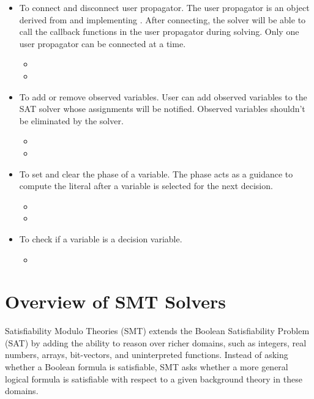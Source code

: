 \begin{itemize}
  \item To connect and disconnect user propagator. The user propagator is an object derived from and implementing . After connecting, the solver will be able to call the callback functions in the user propagator during solving. Only one user propagator can be connected at a time.
  \begin{itemize}
    \item {}
    \item {}
  \end{itemize}
  \item To add or remove observed variables. User can add observed variables to the SAT solver whose assignments will be notified. Observed variables shouldn't be eliminated by the solver.
  \begin{itemize}
    \item {}
    \item {}
  \end{itemize}
  \item To set and clear the phase of a variable. The phase acts as a guidance to compute the literal after a variable is selected for the next decision.
  \begin{itemize}
    \item {}
    \item {}
  \end{itemize}
  \item To check if a variable is a decision variable.
  \begin{itemize}
    \item {}
  \end{itemize}
\end{itemize}

\section{Overview of SMT Solvers}

Satisfiability Modulo Theories (SMT) extends the Boolean Satisfiability Problem (SAT) by adding the ability to reason over richer domains, such as integers, real numbers, arrays, bit-vectors, and uninterpreted functions. Instead of asking whether a Boolean formula is satisfiable, SMT asks whether a more general logical formula is satisfiable with respect to a given background theory in these domains.

